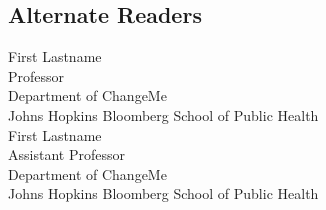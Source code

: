 \subsection*{Alternate Readers}

\begin{singlespace}


\indent First Lastname  \\
\indent \indent Professor\\
\indent \indent Department of ChangeMe\\
\indent \indent  Johns Hopkins Bloomberg School of Public Health \\

\noindent First Lastname  \\
\indent \indent Assistant Professor\\
\indent \indent Department of ChangeMe\\
\indent \indent  Johns Hopkins Bloomberg School of Public Health \\




\end{singlespace}
